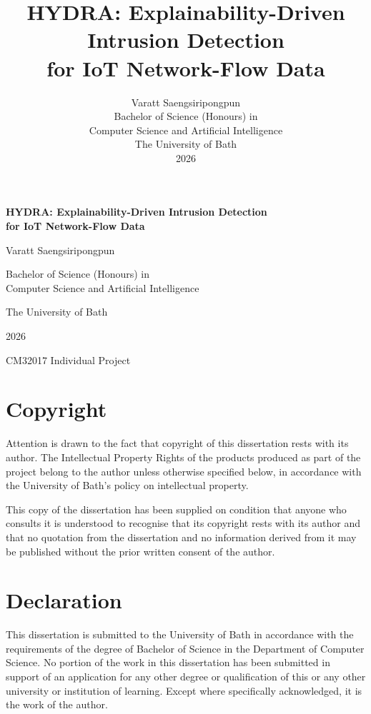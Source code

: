 \documentclass[12pt,a4paper]{report}
\title{\textbf{HYDRA: Explainability-Driven Intrusion Detection\\for IoT Network-Flow Data}}
\author{Varatt Saengsiripongpun\\[1em]
Bachelor of Science (Honours) in\\Computer Science and Artificial Intelligence\\[1em]
The University of Bath\\[1em]
2026}
\date{}
\begin{document}

\begin{titlepage}
\centering
\vspace*{2cm}
{\LARGE\bfseries HYDRA: Explainability-Driven Intrusion Detection\\[0.3em] for IoT Network-Flow Data\par}
\vspace{2cm}
{\Large Varatt Saengsiripongpun\par}
\vspace{1.5cm}
{\large Bachelor of Science (Honours) in\\Computer Science and Artificial Intelligence\par}
\vspace{1.5cm}
{\large The University of Bath\par}
\vspace{1cm}
{\large 2026\par}
\vfill
{\normalsize CM32017 Individual Project\par}
\end{titlepage}

\newpage
\thispagestyle{empty}
\section*{Copyright}
Attention is drawn to the fact that copyright of this dissertation rests with its author. The Intellectual Property Rights of the products produced as part of the project belong to the author unless otherwise specified below, in accordance with the University of Bath's policy on intellectual property.

This copy of the dissertation has been supplied on condition that anyone who consults it is understood to recognise that its copyright rests with its author and that no quotation from the dissertation and no information derived from it may be published without the prior written consent of the author.

\section*{Declaration}
This dissertation is submitted to the University of Bath in accordance with the requirements of the degree of Bachelor of Science in the Department of Computer Science. No portion of the work in this dissertation has been submitted in support of an application for any other degree or qualification of this or any other university or institution of learning. Except where specifically acknowledged, it is the work of the author.
\end{document}
